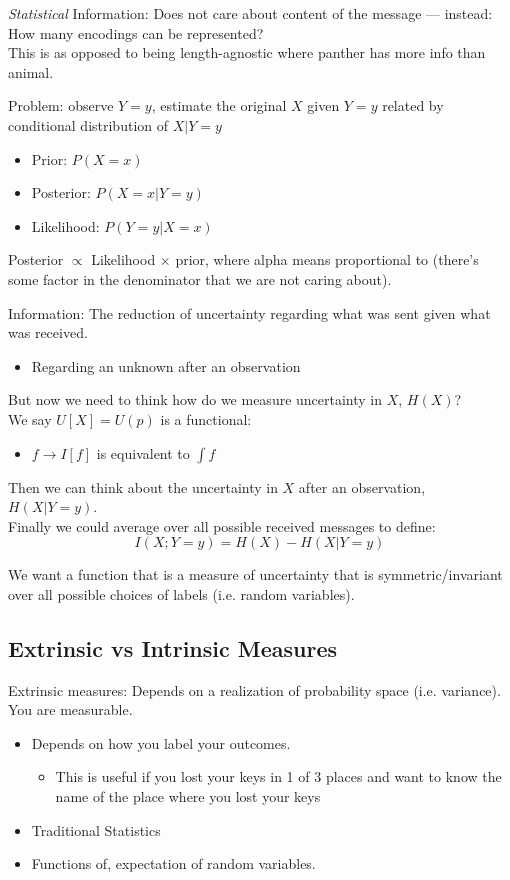 \textit{Statistical} Information: Does not care about content of the message — instead: How many encodings can be represented?\\
This is as opposed to being length-agnostic where panther has more info than animal.

Problem: observe \( Y=y \), estimate the original \( X \) given \( Y=y \) related by conditional distribution of \( X|Y=y \)

\begin{itemize}
    \item Prior: \( P(X = x) \)
    \item Posterior: \( P(X = x | Y = y) \)
    \item Likelihood: \( P(Y = y | X = x) \)
\end{itemize}

Posterior \( \propto \) Likelihood \( \times \) prior, where alpha means proportional to (there’s some factor in the denominator that we are not caring about).

Information: The reduction of uncertainty regarding what was sent given what was received.
\begin{itemize}
    \item Regarding an unknown after an observation
\end{itemize}

But now we need to think how do we measure uncertainty in \( X \), \( H(X) \)?\\
We say \( U[X]=U(p) \) is a functional:
\begin{itemize}
    \item \( f \rightarrow I[f] \) is equivalent to \( \int f \)
\end{itemize}
Then we can think about the uncertainty in \( X \) after an observation, \( H(X | Y=y) \).\\
Finally we could average over all possible received messages to define:
\[ I(X; Y=y) = H(X) - H(X | Y=y) \]

We want a function that is a measure of uncertainty that is symmetric/invariant over all possible choices of labels (i.e. random variables).

\subsection{Extrinsic vs Intrinsic Measures}
Extrinsic measures: Depends on a realization of probability space (i.e. variance). You are measurable.
\begin{itemize}
    \item Depends on how you label your outcomes.
    \begin{itemize}
        \item This is useful if you lost your keys in 1 of 3 places and want to know the name of the place where you lost your keys
    \end{itemize}
    \item Traditional Statistics
    \item Functions of, expectation of random variables.
\end{itemize}

